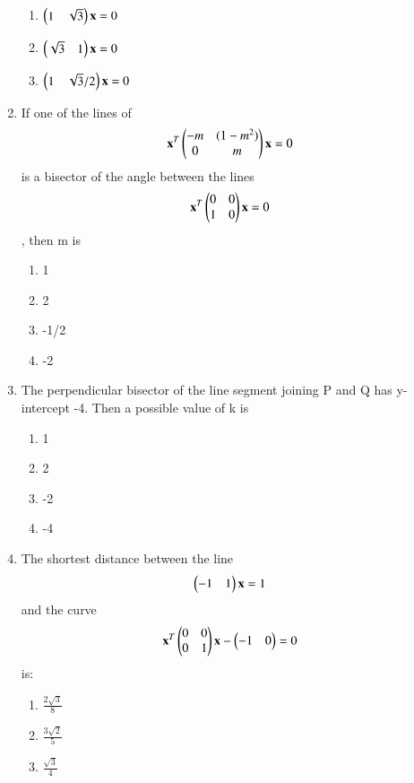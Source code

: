 \begin{enumerate}
\begin{enumerate}
     \item  $\begin{pmatrix}1 & \sqrt3\end{pmatrix} \mathbf {x} = 0$
     \item  $\begin{pmatrix}\sqrt3 & 1\end{pmatrix} \mathbf {x} = 0$
     \item  $\begin{pmatrix}1 & \sqrt3/2\end{pmatrix} \mathbf {x} = 0$\\
     \end{enumerate}
    \item If one of the lines of \begin{align}\mathbf{x}^T\begin{pmatrix}-m & (1-m^2) \\ 0 & m\end{pmatrix} \mathbf {x} &= 0\end{align} is a bisector of the angle between the lines  \begin{align}\mathbf{x}^T\begin{pmatrix}0 & 0 \\ 1 & 0\end{pmatrix} \mathbf {x} &= 0\end{align} , then m is\\ 
    \begin{enumerate}
     \item  1 
     \item  2
     \item  -1/2
     \item  -2
     \end{enumerate}
    \item The perpendicular bisector of the line segment joining P and Q has y-intercept -4. Then a possible value of k is
    \begin{enumerate}
     \item  1 
     \item  2
     \item  -2
     \item  -4
     \end{enumerate}
    \item The shortest distance between the line \begin{align}\begin{pmatrix}-1 & 1\end{pmatrix}\mathbf{x} &= 1\end{align} and the curve \begin{align}\mathbf{x}^T\begin{pmatrix}0 & 0 \\ 0 & 1\end{pmatrix} \mathbf {x} - \begin{pmatrix}-1 & 0\end{pmatrix} &= 0\end{align}  is:\\
    \begin{enumerate}
     \item  $\frac{2\sqrt3}{8}$ 
     \item  $\frac{3\sqrt2}{5}$
     \item  $\frac{\sqrt3}{4}$ 

\end{enumerate}
\end{enumerate}
